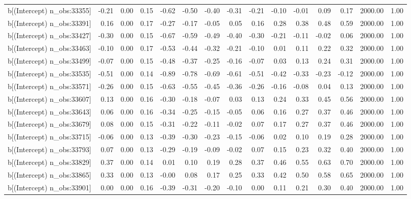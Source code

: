 \begin{table}[ht]
\begin{tabular}{rrrrrrrrrrrrrrr}
  b[(Intercept) n\_obs:33355] & -0.21 & 0.00 & 0.15 & -0.62 & -0.50 & -0.40 & -0.31 & -0.21 & -0.10 & -0.01 & 0.09 & 0.17 & 2000.00 & 1.00 \\ 
  b[(Intercept) n\_obs:33391] & 0.16 & 0.00 & 0.17 & -0.27 & -0.17 & -0.05 & 0.05 & 0.16 & 0.28 & 0.38 & 0.48 & 0.59 & 2000.00 & 1.00 \\ 
  b[(Intercept) n\_obs:33427] & -0.30 & 0.00 & 0.15 & -0.67 & -0.59 & -0.49 & -0.40 & -0.30 & -0.21 & -0.11 & -0.02 & 0.06 & 2000.00 & 1.00 \\ 
  b[(Intercept) n\_obs:33463] & -0.10 & 0.00 & 0.17 & -0.53 & -0.44 & -0.32 & -0.21 & -0.10 & 0.01 & 0.11 & 0.22 & 0.32 & 2000.00 & 1.00 \\ 
  b[(Intercept) n\_obs:33499] & -0.07 & 0.00 & 0.15 & -0.48 & -0.37 & -0.25 & -0.16 & -0.07 & 0.03 & 0.13 & 0.24 & 0.31 & 2000.00 & 1.00 \\ 
  b[(Intercept) n\_obs:33535] & -0.51 & 0.00 & 0.14 & -0.89 & -0.78 & -0.69 & -0.61 & -0.51 & -0.42 & -0.33 & -0.23 & -0.12 & 2000.00 & 1.00 \\ 
  b[(Intercept) n\_obs:33571] & -0.26 & 0.00 & 0.15 & -0.63 & -0.55 & -0.45 & -0.36 & -0.26 & -0.16 & -0.08 & 0.04 & 0.13 & 2000.00 & 1.00 \\ 
  b[(Intercept) n\_obs:33607] & 0.13 & 0.00 & 0.16 & -0.30 & -0.18 & -0.07 & 0.03 & 0.13 & 0.24 & 0.33 & 0.45 & 0.56 & 2000.00 & 1.00 \\ 
  b[(Intercept) n\_obs:33643] & 0.06 & 0.00 & 0.16 & -0.34 & -0.25 & -0.15 & -0.05 & 0.06 & 0.16 & 0.27 & 0.37 & 0.46 & 2000.00 & 1.00 \\ 
  b[(Intercept) n\_obs:33679] & 0.08 & 0.00 & 0.15 & -0.31 & -0.22 & -0.11 & -0.02 & 0.07 & 0.17 & 0.27 & 0.37 & 0.46 & 2000.00 & 1.00 \\ 
  b[(Intercept) n\_obs:33715] & -0.06 & 0.00 & 0.13 & -0.39 & -0.30 & -0.23 & -0.15 & -0.06 & 0.02 & 0.10 & 0.19 & 0.28 & 2000.00 & 1.00 \\ 
  b[(Intercept) n\_obs:33793] & 0.07 & 0.00 & 0.13 & -0.29 & -0.19 & -0.09 & -0.02 & 0.07 & 0.15 & 0.23 & 0.32 & 0.40 & 2000.00 & 1.00 \\ 
  b[(Intercept) n\_obs:33829] & 0.37 & 0.00 & 0.14 & 0.01 & 0.10 & 0.19 & 0.28 & 0.37 & 0.46 & 0.55 & 0.63 & 0.70 & 2000.00 & 1.00 \\ 
  b[(Intercept) n\_obs:33865] & 0.33 & 0.00 & 0.13 & -0.00 & 0.08 & 0.17 & 0.25 & 0.33 & 0.42 & 0.50 & 0.58 & 0.65 & 2000.00 & 1.00 \\ 
  b[(Intercept) n\_obs:33901] & 0.00 & 0.00 & 0.16 & -0.39 & -0.31 & -0.20 & -0.10 & 0.00 & 0.11 & 0.21 & 0.30 & 0.40 & 2000.00 & 1.00 \\ 

\end{tabular}
\end{table}
